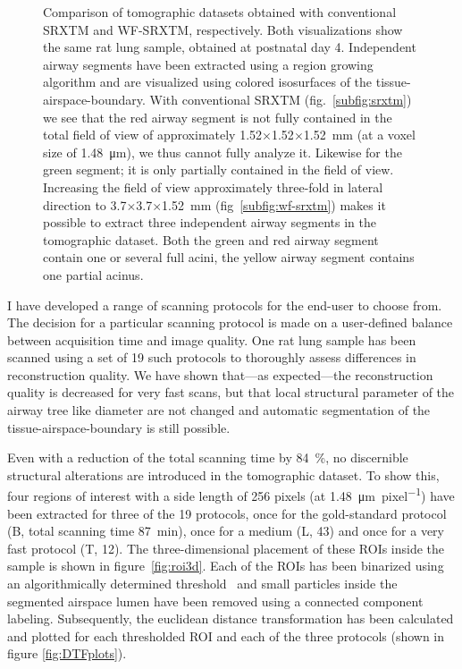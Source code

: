 \documentclass[a4paper,twoside,DIV=calc]{scrartcl}
\newlength\imagescale
\begin{document}
\begin{figure}[htp]
{%
		\fi
		\label{subfig:wf-srxtm}%
		}%
	\caption{Comparison of tomographic datasets obtained with conventional SRXTM and WF-SRXTM, respectively. Both visualizations show the same rat lung sample, obtained at postnatal day 4. Independent airway segments have been extracted using a region growing algorithm and are visualized using colored isosurfaces of the tissue-airspace-boundary. With conventional SRXTM (fig.~\ref{subfig:srxtm}) we see that the red airway segment is not fully contained in the total field of view of approximately 1.52$\times$1.52$\times$\SI{1.52}{\milli\meter} (at a voxel size of \SI{1.48}{\micro\meter}), we thus cannot fully analyze it. Likewise for the green segment; it is only partially contained in the field of view. Increasing the field of view approximately three-fold in lateral direction to 3.7$\times$3.7$\times$\SI{1.52}{\milli\meter} %
(fig~\ref{subfig:wf-srxtm}) makes it possible to extract three independent airway segments in the tomographic dataset. Both the green and red airway segment contain one or several full acini, the yellow airway segment contains one partial acinus.%
}%
\label{fig:wfs-overview}%
\end{figure}

I have developed a range of scanning protocols for the end-user to choose from. The decision for a particular scanning protocol is made on a user-defined balance between acquisition time and image quality. One rat lung sample has been scanned using a set of 19 such protocols to thoroughly assess differences in reconstruction quality. We have shown that---as expected---the reconstruction quality is decreased for very fast scans, but that local structural parameter of the airway tree like diameter are not changed and automatic segmentation of the tissue-airspace-boundary is still possible.

Even with a reduction of the total scanning time by \SI{84}{\percent}, no discernible structural alterations are introduced in the tomographic dataset. To show this, four regions of interest with a side length of 256 pixels (at \SI{1.48}{\micro\meter\per pixel}) have been extracted for three of the 19 protocols, once for the gold-standard protocol (B, total scanning time \SI{87}{\minute}), once for a medium (L, \SI{43}{\min}) and once for a very fast protocol (T, \SI{12}{\min}). The three-dimensional placement of these ROIs inside the sample is shown in figure~\ref{fig:roi3d}. Each of the ROIs has been binarized using an algorithmically determined threshold~\cite{Otsu1979} and small particles inside the segmented airspace lumen have been removed using a connected component labeling. Subsequently, the euclidean distance transformation has been calculated and plotted for each thresholded ROI and each of the three protocols (shown in figure	\ref{fig:DTFplots}).
\end{document}
